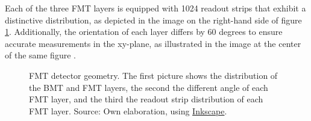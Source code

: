     Each of the three FMT layers is equipped with 1024 readout strips that exhibit a distinctive distribution, as depicted in the image on the right-hand side of figure \ref{fig::fmt_geometry}.
    Additionally, the orientation of each layer differs by 60 degrees to ensure accurate measurements in the xy-plane, as illustrated in the image at the center of the same figure \cite{acker2020mvt}.

    \begin{figure}[t]
        \centering{}
        \caption[FMT detector geometry.]{FMT detector geometry. The first picture shows the distribution of the BMT and FMT layers, the second the different angle of each FMT layer, and the third the readout strip distribution of each FMT layer.
        Source: Own elaboration, using \hyperlink{inkscape.org/}{Inkscape}.}
        \label{fig::fmt_geometry}
    \end{figure}

    
